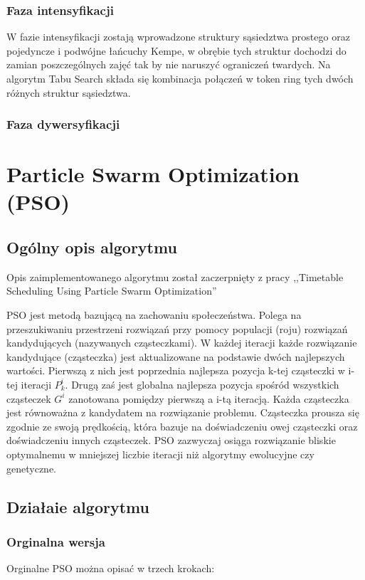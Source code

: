 \documentclass[11pt]{report}
\begin{document}
\subsubsection{Faza intensyfikacji}
\par W fazie intensyfikacji zostają wprowadzone struktury sąsiedztwa prostego oraz pojedyncze i podwójne łańcuchy Kempe, w obrębie tych struktur dochodzi do zamian poszczególnych zajęć tak by nie naruszyć ograniczeń twardych. Na algorytm Tabu Search składa się kombinacja połączeń w token ring tych dwóch różnych struktur sąsiedztwa.
\subsubsection{Faza dywersyfikacji}

\section{Particle Swarm Optimization (PSO)}
\subsection{Ogólny opis algorytmu}
\par Opis zaimplementowanego algorytmu został zaczerpnięty z pracy ,,Timetable Scheduling Using Particle Swarm Optimization'' \cite{pso}
\par PSO jest metodą bazującą na zachowaniu społeczeństwa. Polega na przeszukiwaniu przestrzeni rozwiązań przy pomocy populacji (roju) rozwiązań kandydujących (nazywanych cząsteczkami). W każdej iteracji każde rozwiązanie kandydujące (cząsteczka) jest aktualizowane na podstawie dwóch najlepszych wartości. Pierwszą z nich jest poprzednia najlepsza pozycja k-tej cząsteczki w i-tej iteracji ${P}^{i}_{k}$. Drugą zaś jest globalna najlepsza pozycja spośród wszystkich cząsteczek ${G}^{i}$ zanotowana pomiędzy pierwszą a i-tą iteracją. Każda cząsteczka jest równoważna z kandydatem na rozwiązanie problemu. Cząsteczka prousza się zgodnie ze swoją prędkością, która bazuje na doświadczeniu owej cząsteczki oraz doświadczeniu innych cząsteczek. PSO zazwyczaj osiąga rozwiązanie bliskie optymalnemu w mniejszej liczbie iteracji niż algorytmy ewolucyjne czy genetyczne.  \subsection{Działaie algorytmu}
\subsubsection{Orginalna wersja}
\par Orginalne PSO można opisać w trzech krokach:
\end{document}
